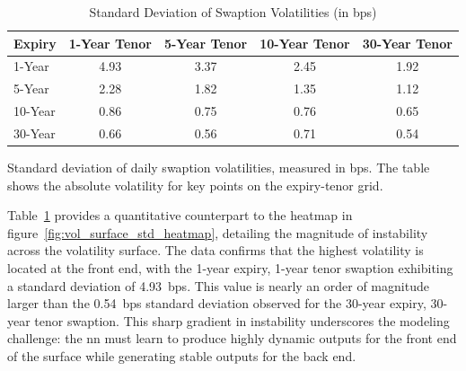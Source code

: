 \begin{table}[H]
	\centering
	\begin{threeparttable}
		\caption{Standard Deviation of Swaption Volatilities (in \ac{bps})}
		\label{tab:vol_std_summary}
		\begin{tabular}{lcccc}
			\toprule
			\textbf{Expiry} & \textbf{1-Year Tenor} & \textbf{5-Year Tenor} & \textbf{10-Year Tenor} & \textbf{30-Year Tenor} \\
			\midrule
			1-Year          & 4.93                  & 3.37                  & 2.45                   & 1.92                   \\
			5-Year          & 2.28                  & 1.82                  & 1.35                   & 1.12                   \\
			10-Year         & 0.86                  & 0.75                  & 0.76                   & 0.65                   \\
			30-Year         & 0.66                  & 0.56                  & 0.71                   & 0.54                   \\
			\bottomrule
		\end{tabular}
		\begin{tablenotes}
			\footnotesize
			\item  Standard deviation of daily swaption volatilities, measured in \ac{bps}. The table shows the absolute volatility for key points on the expiry-tenor grid.
		\end{tablenotes}
	\end{threeparttable}
\end{table}

Table~\ref{tab:vol_std_summary} provides a quantitative counterpart to the heatmap in figure~\ref{fig:vol_surface_std_heatmap}, detailing the magnitude of instability across the volatility surface. The data confirms that the highest volatility is located at the front end, with the 1-year expiry, 1-year tenor swaption exhibiting a standard deviation of 4.93~\ac{bps}. This value is nearly an order of magnitude larger than the 0.54~\ac{bps} standard deviation observed for the 30-year expiry, 30-year tenor swaption. This sharp gradient in instability underscores the modeling challenge: the \ac{nn} must learn to produce highly dynamic outputs for the front end of the surface while generating stable outputs for the back end.

